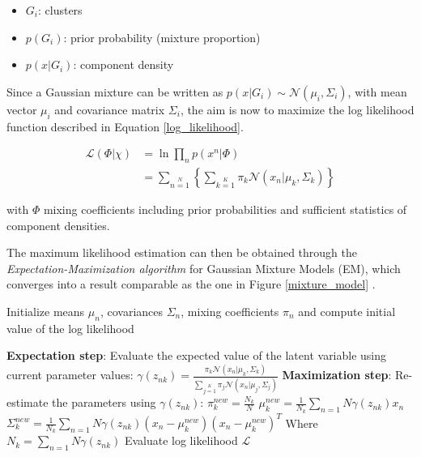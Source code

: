 \begin{itemize}
\item $G_i$: clusters
\item $p(G_i)$: prior probability (mixture proportion)
\item $p(x|G_i)$: component density
\end{itemize}

\noindent Since a Gaussian mixture can be written as $p(x|G_i) \sim \mathcal{N}(\mu_i, \Sigma_i)$, with mean vector $\mu_i$ and covariance matrix $\Sigma_i$, the aim is now to maximize the log likelihood function described in Equation \ref{log_likelihood}.

\begin{equation}
\begin{array}{ll}
\mathcal{L}(\Phi|\chi) & = \ln \prod\limits_n p(x^n | \Phi) \\
 & = \sum\limits_{n=1}\limits^{N} \left\{ \sum \limits_{k=1}\limits^{K} \pi_k \mathcal{N}(x_n|\mu_k, \Sigma_k)\right\}
\end{array}
\label{log_likelihood}
\end{equation}

\noindent with $\Phi$ mixing coefficients including prior probabilities and sufficient statistics of component densities.
\newline

\noindent The maximum likelihood estimation can then be obtained through the \textit{Expectation-Maximization algorithm} for Gaussian Mixture Models (EM), which converges into a result comparable as the one in Figure \ref{mixture_model} \cite{BIS06}.
\newline

\begin{algorithmic}
\State Initialize means $\mu_n$, covariances $\Sigma_n$, mixing coefficients $\pi_n$ and compute initial value of the log likelihood

\Repeat
	\State \textbf{Expectation step}: Evaluate the expected value of the latent variable using current parameter values:
		\State $\gamma(z_{nk}) = 
		\frac{\pi_k\mathcal{N}(x_n|\mu_k, \Sigma_k)}{\sum\limits_{j=1}\limits^{K}\pi_j\mathcal{N}(x_n|\mu_j, \Sigma_j)}$
	\State \textbf{Maximization step}: Re-estimate the parameters using $\gamma(z_{nk})$:
		\State $\pi^{new}_k = \frac{N_k}{N}$
		\State $\mu^{new}_k = \frac{1}{N_k}\sum\limits_{n=1}\limits{N}\gamma(z_{nk})x_n$
		\State $\Sigma^{new}_k = \frac{1}{N_k}\sum\limits_{n=1}\limits{N}\gamma(z_{nk}) (x_n - \mu^{new}_k) (x_n - \mu^{new}_k)^T$
		\State Where $N_k = \sum\limits_{n=1}\limits{N}\gamma(z_{nk})$
	\State Evaluate log likelihood $\mathcal{L}$ 
\end{algorithmic}

